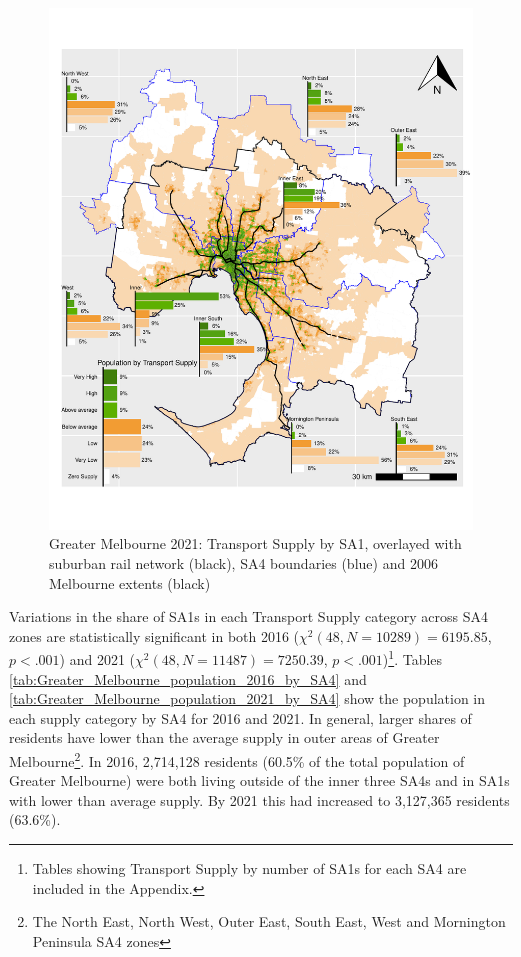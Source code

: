 \documentclass[preprint, 3p,
authoryear]{elsarticle} %
\begin{document}
\begin{figure}
\includegraphics[width=1\linewidth]{ReynoldsCurrieQu2024_files/figure-latex/Greater_Melbourne_population_2021_by_SA4-1} \caption{Greater Melbourne 2021: Transport Supply by SA1,  overlayed with suburban rail network (black), SA4 boundaries (blue) and 2006 Melbourne extents (black)}\label{fig:Greater_Melbourne_population_2021_by_SA4}
\end{figure}

Variations in the share of SA1s in each Transport Supply category across
SA4 zones are statistically significant in both 2016
(\(\chi^2(48, N = 10289) = 6195.85\), \(p < .001\)) and 2021
(\(\chi^2(48, N = 11487) = 7250.39\), \(p < .001\))\footnote{Tables
  showing Transport Supply by number of SA1s for each SA4 are included
  in the Appendix.}. Tables
\ref{tab:Greater_Melbourne_population_2016_by_SA4} and
\ref{tab:Greater_Melbourne_population_2021_by_SA4} show the population
in each supply category by SA4 for 2016 and 2021. In general, larger
shares of residents have lower than the average supply in outer areas of
Greater Melbourne\footnote{The North East, North West, Outer East, South
  East, West and Mornington Peninsula SA4 zones}. In 2016, 2,714,128
residents (60.5\% of the total population of Greater Melbourne) were
both living outside of the inner three SA4s and in SA1s with lower than
average supply. By 2021 this had increased to 3,127,365 residents
(63.6\%).
\end{document}
